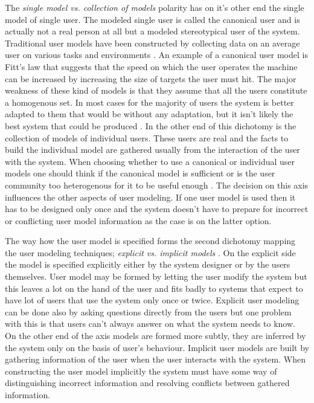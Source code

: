 \documentclass{sigchi}
\begin{document}
The \textit{single model vs. collection of models} polarity \cite{rich99} has on it's other end the single model of single user. The modeled single user is called the canonical user and is actually not a real person at all but a modeled stereotypical user of the system. Traditional user models have been constructed by collecting data on an average user on various tasks and environments \cite{rich99}. An example of a canonical user model is Fitt's law that suggests that the speed on which the user operates the machine can be increased by increasing the size of targets the user must hit. The major weakness of these kind of models is that they assume that all the users constitute a homogenous set. In most cases for the majority of users the system is better adapted to them that would be without any adaptation, but it isn't likely the best system that could be produced \cite{rich99}. In the other end of this dichotomy is the collection of models of individual users. These users are real and the facts to build the individual model are gathered usually from the interaction of the user with the system. When choosing whether to use a canonical or individual user models one should think if the canonical model is sufficient or is the user community too heterogenous for it to be useful enough \cite{rich99}. The decision on this axis influences the other aspects of user modeling. If one user model is used then it has to be designed only once and the system doesn't have to prepare for incorrect or conflicting user model information as the case is on the latter option. 

The way how the user model is specified forms the second dichotomy mapping the user modeling techniques; \textit{explicit vs. implicit models} \cite{rich99}. On the explicit side the model is specified explicitly either by the system designer or by the users themselves. User model may be formed by letting the user modify the system but this leaves a lot on the hand of the user and fits badly to systems that expect to have lot of users that use the system only once or twice. Explicit user modeling can be done also by asking questions directly from the users but one problem with this is that users can't always answer on what the system needs to know. On the other end of the axis models are formed more subtly, they are inferred by the system only on the basis of user's behaviour. Implicit user models are built by gathering information of the user when the user interacts with the system. When constructing the user model implicitly the system must have some way of distinguishing incorrect information and resolving conflicts between gathered information.
\end{document}
